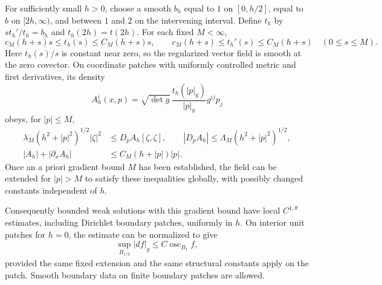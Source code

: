 \begin{lemma}
\label{str-pde-regularity-input}
For sufficiently small $h>0$, choose a smooth $b_h$ equal to $1$ on
$[0,h/2]$, equal to $b$ on $[2h,\infty)$, and between $1$ and $2$ on
the intervening interval. Define $t_h$ by
$s t_h'/t_h=b_h$ and $t_h(2h)=t(2h)$. For each fixed $M<\infty$,
\begin{equation}\label{str-pde-regularized-structure}
 c_M(h+s)s\leq t_h(s)\leq C_M(h+s)s,\qquad
 c_M(h+s)\leq t_h'(s)\leq C_M(h+s)
 \quad(0\leq s\leq M).
\end{equation}
Here $t_h(s)/s$ is constant near zero, so the regularized vector
field is smooth at the zero covector. On coordinate patches with
uniformly controlled metric and first derivatives, its density
\[
 A_h^i(x,p)=\sqrt{\det g}\,\frac{t_h(|p|_g)}{|p|_g}g^{ij}p_j
\]
obeys, for $|p|\leq M$,
\begin{equation}\label{str-pde-density-structure}
 \begin{split}
 \lambda_M(h^2+|p|^2)^{1/2}|\zeta|^2
 &\leq D_pA_h[\zeta,\zeta],\qquad
 |D_pA_h|\leq\Lambda_M(h^2+|p|^2)^{1/2},\\
 |A_h|+|\partial_x A_h|&\leq C_M(h+|p|)|p|.
 \end{split}
\end{equation}
Once an a priori gradient bound $M$ has been established, the field
can be extended for $|p|>M$ to satisfy these inequalities globally,
with possibly changed constants independent of $h$.

Consequently bounded weak solutions with this gradient bound have
local $C^{1,\theta}$ estimates, including Dirichlet boundary patches,
uniformly in $h$. On interior unit patches for $h=0$, the estimate
can be normalized to give
\begin{equation}\label{str-pde-oscillation-gradient}
 \sup_{B_{1/2}}|df|_g\leq C\operatorname{osc}_{B_1} f,
\end{equation}
provided the same fixed extension and the same structural constants
apply on the patch. Smooth boundary data on finite boundary patches
are allowed.
\end{lemma}
